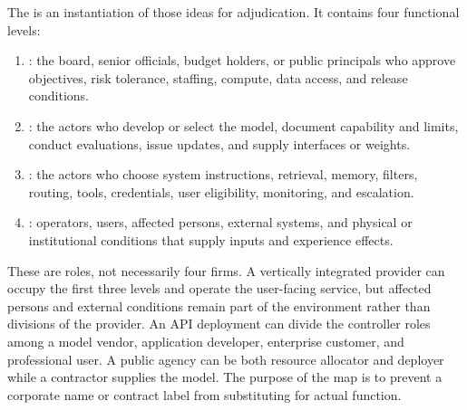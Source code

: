 The \Cascade{} is an instantiation of those ideas for adjudication. It contains four functional levels:

\begin{enumerate}[leftmargin=2.2em]
\item {}: the board, senior officials, budget holders, or public principals who approve objectives, risk tolerance, staffing, compute, data access, and release conditions.
\item {}: the actors who develop or select the model, document capability and limits, conduct evaluations, issue updates, and supply interfaces or weights.
\item {}: the actors who choose system instructions, retrieval, memory, filters, routing, tools, credentials, user eligibility, monitoring, and escalation.
\item {}: operators, users, affected persons, external systems, and physical or institutional conditions that supply inputs and experience effects.
\end{enumerate}

These are roles, not necessarily four firms. A vertically integrated provider can occupy the first three levels and operate the user-facing service, but affected persons and external conditions remain part of the environment rather than divisions of the provider. An API deployment can divide the controller roles among a model vendor, application developer, enterprise customer, and professional user. A public agency can be both resource allocator and deployer while a contractor supplies the model. The purpose of the map is to prevent a corporate name or contract label from substituting for actual function.

